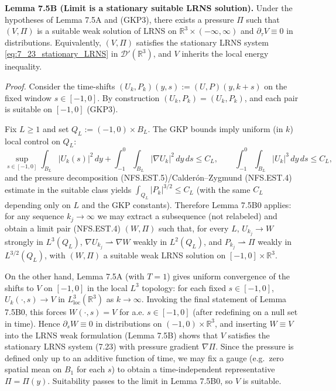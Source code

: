 \documentclass[
  11pt,
]{article}
\begin{document}
\textbf{Lemma 7.5B (Limit is a stationary suitable LRNS solution).} Under the hypotheses of Lemma 7.5A and (GKP3), there exists a pressure \(\Pi\) such that \((V,\Pi)\) is a suitable weak solution of LRNS on \(\mathbb R^3\times(-\infty,\infty)\) and \(\partial_\tau V\equiv 0\) in distributions. Equivalently, \((V,\Pi)\) satisfies the stationary LRNS system \eqref{eq:7_23_stationary_LRNS} in \(\mathcal D'(\mathbb R^3)\), and \(V\) inherits the local energy inequality.

\emph{Proof.} Consider the time-shifts \((U_k,P_k)(y,s):=(U,P)(y,k+s)\) on the fixed window \(s\in[-1,0]\). By construction \((U_k,P_k)=(U_k,P_k)\), and each pair is suitable on \([-1,0]\) (GKP3).

Fix \(L\ge 1\) and set \(Q_L:=(-1,0)\times B_L\). The GKP bounds imply uniform (in \(k\)) local control on \(Q_L\): \[
\sup_{s\in[-1,0]}\int_{B_L}|U_k(s)|^2\,dy
+\int_{-1}^0\!\!\int_{B_L}|\nabla U_k|^2\,dy\,ds
\le C_L,
\qquad
\int_{-1}^0\!\!\int_{B_L}|U_k|^3\,dy\,ds\le C_L,
\] and the pressure decomposition (NFS.EST.5)/Calderón--Zygmund (NFS.EST.4) estimate in the suitable class yields \(\int_{Q_L}|P_k|^{3/2}\le C_L\) (with the same \(C_L\) depending only on \(L\) and the GKP constants). Therefore Lemma 7.5B0 applies: for any sequence \(k_j\to\infty\) we may extract a subsequence (not relabeled) and obtain a limit pair (NFS.EST.4) \((W,\Pi)\) such that, for every \(L\), \(U_{k_j}\to W\) strongly in \(L^3(Q_L)\), \(\nabla U_{k_j}\rightharpoonup \nabla W\) weakly in \(L^2(Q_L)\), and \(P_{k_j}\rightharpoonup \Pi\) weakly in \(L^{3/2}(Q_L)\), with \((W,\Pi)\) a suitable weak LRNS solution on \([-1,0]\times\mathbb R^3\).

On the other hand, Lemma 7.5A (with \(T=1\)) gives uniform convergence of the shifts to \(V\) on \([-1,0]\) in the local \(L^3\) topology: for each fixed \(s\in[-1,0]\), \(U_k(\cdot,s)\to V\) in \(L^3_{\mathrm{loc}}(\mathbb R^3)\) as \(k\to\infty\). Invoking the final statement of Lemma 7.5B0, this forces \(W(\cdot,s)=V\) for a.e. \(s\in[-1,0]\) (after redefining on a null set in time). Hence \(\partial_s W\equiv 0\) in distributions on \((-1,0)\times\mathbb R^3\), and inserting \(W\equiv V\) into the LRNS weak formulation (Lemma 7.5B) shows that \(V\) satisfies the stationary LRNS system (7.23) with pressure gradient \(\nabla\Pi\). Since the pressure is defined only up to an additive function of time, we may fix a gauge (e.g.~zero spatial mean on \(B_1\) for each \(s\)) to obtain a time-independent representative \(\Pi=\Pi(y)\). Suitability passes to the limit in Lemma 7.5B0, so \(V\) is suitable.
\end{document}
